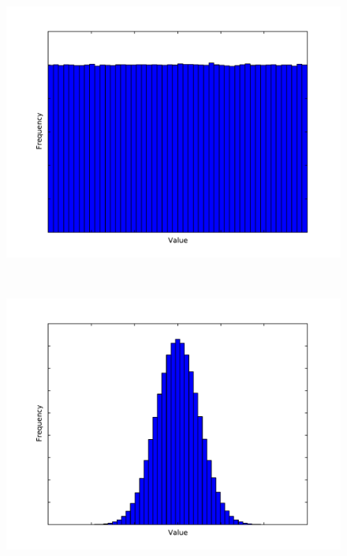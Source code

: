 \begin{figure}
	\begin{center}
		\begin{subfloat}{%
			\includegraphics[scale=0.25]{figures/freqdist_uniform.pdf}
		}
		\end{subfloat}~
		\begin{subfloat}{%
			\includegraphics[scale=0.25]{figures/freqdist_gaussian.pdf}
		}
		\end{subfloat}~

\end{center}
\end{figure}
